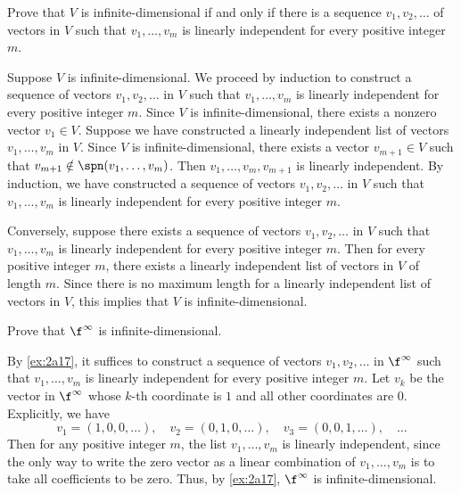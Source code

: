 \begin{exercise}[2a17]
    Prove that $V$ is infinite-dimensional if and only if there is a sequence $v_1, v_2, \ldots$ of vectors in $V$ such that $v_1, \ldots, v_m$ is linearly independent for every positive integer $m$.
\end{exercise}

\begin{sol}
    Suppose $V$ is infinite-dimensional. We proceed by induction to construct a sequence of vectors $v_1, v_2, \ldots$ in $V$ such that $v_1, \ldots, v_m$ is linearly independent for every positive integer $m$. Since $V$ is infinite-dimensional, there exists a nonzero vector $v_1 \in V$. Suppose we have constructed a linearly independent list of vectors $v_1, \ldots, v_m$ in $V$. Since $V$ is infinite-dimensional, there exists a vector $v_{m+1} \in V$ such that $v_{m + 1} \notin \spn(v_1, \ldots, v_m)$. Then $v_1, \ldots, v_m, v_{m+1}$ is linearly independent. By induction, we have constructed a sequence of vectors $v_1, v_2, \ldots$ in $V$ such that $v_1, \ldots, v_m$ is linearly independent for every positive integer $m$.

    Conversely, suppose there exists a sequence of vectors $v_1, v_2, \ldots$ in $V$ such that $v_1, \ldots, v_m$ is linearly independent for every positive integer $m$. Then for every positive integer $m$, there exists a linearly independent list of vectors in $V$ of length $m$. Since there is no maximum length for a linearly independent list of vectors in $V$, this implies that $V$ is infinite-dimensional.
\end{sol}
 
\begin{exercise}[2a18]
    Prove that $\f^\infty$ is infinite-dimensional.
\end{exercise}

\begin{sol}
    By \autoref{ex:2a17}, it suffices to construct a sequence of vectors $v_1, v_2, \ldots$ in $\f^\infty$ such that $v_1, \ldots, v_m$ is linearly independent for every positive integer $m$. Let $v_k$ be the vector in $\f^\infty$ whose $k$-th coordinate is $1$ and all other coordinates are $0$. Explicitly, we have
    \[v_1 = (1, 0, 0, \ldots), \quad v_2 = (0, 1, 0, \ldots), \quad v_3 = (0, 0, 1, \ldots), \quad \ldots\]
    Then for any positive integer $m$, the list $v_1, \ldots, v_m$ is linearly independent, since the only way to write the zero vector as a linear combination of $v_1, \ldots, v_m$ is to take all coefficients to be zero. Thus, by \autoref{ex:2a17}, $\f^\infty$ is infinite-dimensional.
\end{sol}
 
